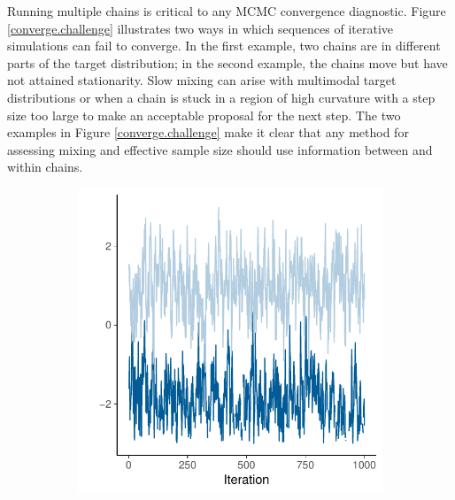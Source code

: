 \documentclass[american,]{article}
\theoremstyle{definition}
\begin{document}
Running multiple chains is critical to any MCMC convergence diagnostic. Figure
\ref{converge.challenge} illustrates two ways in which sequences of
iterative simulations can fail to converge.  In the first example, two chains
are in different parts of the target distribution; in the second
example, the chains move but have not attained stationarity. Slow mixing can arise with multimodal target distributions or when a chain is
stuck in a region of high curvature with a step size too large to make an
acceptable proposal for the next step. The two examples in Figure \ref{converge.challenge}  make it clear that 
any method for assessing mixing and effective sample size should use information
between and within chains.

\begin{figure}
\center
  \begin{subfigure}[b]{0.37\textwidth}
    \includegraphics[width=\textwidth]{graphics/convergechallenge1.pdf}
  \end{subfigure}
  \hspace{8mm}
\begin{subfigure}[b]{0.37\textwidth}

\end{subfigure}
\end{figure}
\end{document}
